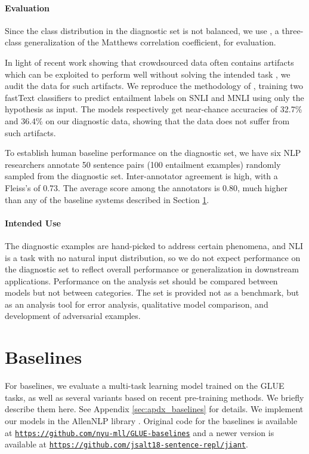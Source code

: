 \documentclass{article} \usepackage{iclr2019_conference,times}
\begin{document}
\paragraph{Evaluation}
Since the class distribution in the diagnostic set is not balanced, we use  \citep{gorodkin2004Rk}, a three-class generalization of the Matthews correlation coefficient, for evaluation.


In light of recent work showing that crowdsourced data often contains artifacts which can be exploited to perform well without solving the intended task 
\citep[][ i.a.]{schwartz17cloze,poliak2018hypothesis,TSUCHIYA18.786},
we audit the data for such artifacts.
We reproduce the methodology of \citet{gurudipta18artifacts},
training two fastText classifiers \citep{joulin2016bag} to predict entailment labels on SNLI and MNLI using only the hypothesis as input. 
The models respectively get near-chance accuracies of 32.7\% and 36.4\% on our diagnostic data, showing that the data does not suffer from such artifacts. 

To establish human baseline performance on the diagnostic set, we have six NLP researchers annotate 50 sentence pairs (100 entailment examples) randomly sampled from the diagnostic set. Inter-annotator agreement is high, with a Fleiss's  of 0.73.
The average  score among the annotators is 0.80, much higher than any of the baseline systems described in Section \ref{sec:baselines}. 



\paragraph{Intended Use}
The diagnostic examples are hand-picked to address certain phenomena, and NLI is a task with no natural input distribution, so we do not expect performance on the diagnostic set to reflect overall performance or generalization in downstream applications. Performance on the analysis set should be compared between models but not between categories. The set is provided not as a benchmark, but as an analysis tool for error analysis, qualitative model comparison, and development of adversarial examples.




\section{Baselines}\label{sec:baselines}

For baselines, we evaluate a multi-task learning model trained on the GLUE tasks, as well as several variants based on recent pre-training methods.
We briefly describe them here. See Appendix \ref{sec:apdx_baselines} for details.
We implement our models in the AllenNLP library \citep{Gardner2017AllenNLPAD}.
Original code for the baselines is available at \texttt{\href{https://github.com/nyu-mll/GLUE-baselines}{https://github.com/nyu-mll/GLUE-baselines}} 
and a newer version is available at \texttt{\href{https://github.com/jsalt18-sentence-repl/jiant}{https://github.com/jsalt18-sentence-repl/jiant}}.
\end{document}
